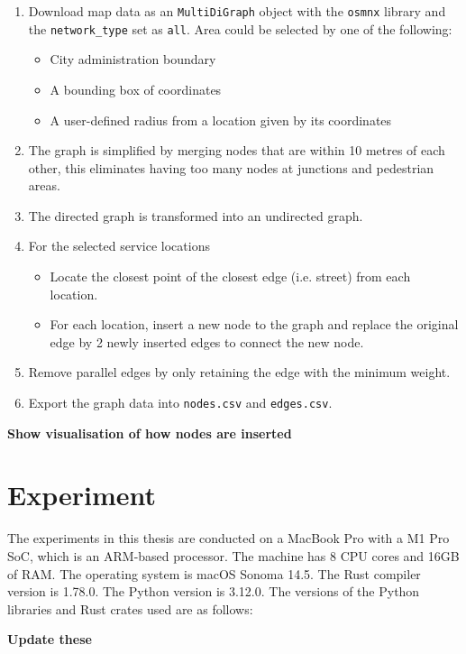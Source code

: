 \begin{enumerate}
    \item Download map data as an \verb|MultiDiGraph| object with the \verb|osmnx| library and the \verb|network_type| set as \verb|all|. Area could be selected by one of the following:
    \begin{itemize}
        \item City administration boundary
        \item A bounding box of coordinates
        \item A user-defined radius from a location given by its coordinates
    \end{itemize}
    \item The graph is simplified by merging nodes that are within 10 metres of each other, this eliminates having too many nodes at junctions and pedestrian areas.
    \item The directed graph is transformed into an undirected graph.
    \item For the selected service locations
    \begin{itemize}
        \item Locate the closest point of the closest edge (i.e. street) from each location.
        \item For each location, insert a new node to the graph and replace the original edge by 2 newly inserted edges to connect the new node.
    \end{itemize}
    \item Remove parallel edges by only retaining the edge with the minimum weight.
    \item Export the graph data into \verb|nodes.csv| and \verb|edges.csv|.
\end{enumerate}

\textbf{Show visualisation of how nodes are inserted}

\section{Experiment}

The experiments in this thesis are conducted on a MacBook Pro with a M1 Pro SoC, which is an ARM-based processor. The machine has 8 CPU cores and 16GB of RAM. The operating system is macOS Sonoma 14.5. The Rust compiler version is 1.78.0. The Python version is 3.12.0. The versions of the Python libraries and Rust crates used are as follows:

\textbf{Update these}

